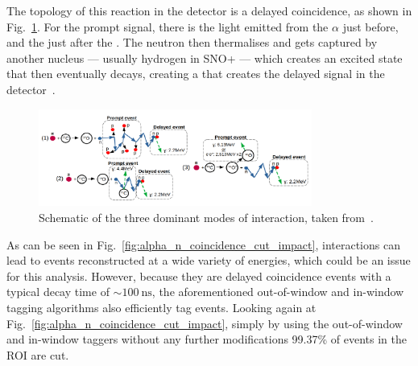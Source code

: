 The topology of this reaction in the detector is a delayed coincidence, as shown in Fig.~\ref{fig:alpha_n_drawing}. %
For the prompt signal, there is the light emitted from the $\alpha$ just before, and the  just after the \alphan{}. The neutron then thermalises and gets captured by another nucleus --- usually hydrogen in SNO+ --- which creates an excited state that then eventually decays, creating a \ce{\gamma} that creates the delayed signal in the detector~\cite{}. %

\begin{figure}
    \centering
    \includegraphics[width=0.8\textwidth]{6_SolarAnalysis/images/alpha_n_schematic_Iwan_modified.pdf}
    \caption[Schematic of \alphan{} interactions.]{Schematic of the three dominant modes of \alphan{} interaction, taken from~\cite{morton-blakeFirstMeasurementReactor2021}. %
    }
    \label{fig:alpha_n_drawing}
\end{figure}

As can be seen in Fig.~\ref{fig:alpha_n_coincidence_cut_impact}, \alphan{} interactions can lead to events reconstructed at a wide variety of energies, which could be an issue for this analysis. However, because they are delayed coincidence events with a typical decay time of $\sim\SI{100}{\nano\second}$, the aforementioned out-of-window and in-window  tagging algorithms also efficiently tag \alphan{} events. Looking again at Fig.~\ref{fig:alpha_n_coincidence_cut_impact}, simply by using the out-of-window and in-window  taggers without any further modifications 99.37\% of events in the ROI are cut.

